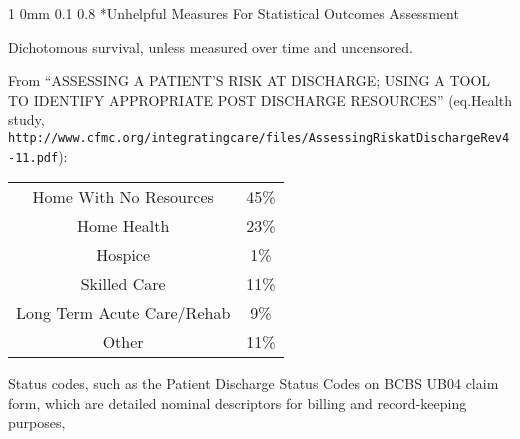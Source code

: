\documentclass[12pt]{article}
\makeatletter
\newcommand{\9}{\\[9pt]}
\renewcommand{\section}{\@startsection
	    {section}%
	    {1}%
	    {0mm}%
	    {0.1\baselineskip}%
	    {0.8\baselineskip}%
	    {\newpage \color[cmyk]{0.43,0,0.01,0} \center\LARGE}}%
\makeatother
\begin{document}
\begin{landscape}
\begin{Large}
{\section*{Unhelpful Measures For Statistical Outcomes Assessment}
\begin{ohlist}
    \item   Dichotomous survival, unless measured over time and uncensored.
    \item   From ``ASSESSING A PATIENT’S RISK AT DISCHARGE; USING A TOOL TO IDENTIFY APPROPRIATE POST DISCHARGE RESOURCES''
            (eq.Health study,\\ \texttt{http://www.cfmc.org/integratingcare/files/AssessingRiskatDischargeRev4-11.pdf}):
            \begin{center}
            \begin{tabular}{|c|c|}
                \hline
                Home With No Resources      & 45\% \\
                Home Health                 & 23\% \\
                Hospice                     & 1\% \\
                Skilled Care                & 11\% \\
                Long Term Acute Care/Rehab  & 9\% \\
                Other                       & 11\% \\
                \hline
            \end{tabular}
            \end{center}
            \vspace{11pt}
    \item   Status codes, such as the Patient Discharge Status Codes on BCBS UB04 claim form, which are detailed nominal descriptors 
            for billing and record-keeping purposes,
\end{ohlist}

}
\end{Large}
\end{landscape}
\end{document}
